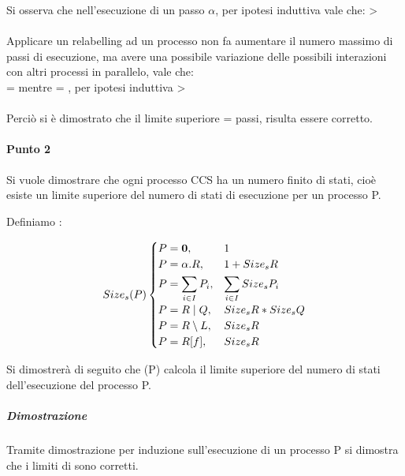 \begin{itemize}
\begin{itemize}
			Si osserva che nell'esecuzione di un passo $\alpha$, per ipotesi induttiva vale che:  >   \\
			\\
			Applicare un relabelling ad un processo non fa aumentare il numero massimo di passi di esecuzione, ma avere una possibile variazione delle possibili interazioni con altri processi in parallelo, vale che:\\  =  mentre  = , per ipotesi induttiva  > \\
			\\
		Perciò si è dimostrato che il limite superiore  =  passi, risulta essere corretto.	
				
	\end{itemize}

	
\end{itemize}

\paragraph{Punto 2} \mbox{}

Si vuole dimostrare che ogni processo CCS ha un numero finito di stati, cioè esiste un limite superiore del numero di stati di esecuzione per un processo P.

Definiamo :

\[
Size_{s}(P)
\begin{cases}
P=\mathbf{0}, 			& 1							\\
P=\alpha.R,     & 1+Size_{s}{R}                \\
P=\displaystyle\sum_{i\in I}^{}P_{i},          & \displaystyle\sum_{i\in I}^{}Size_{s}{P_{i}} \\
P=R\mid Q,      & Size_{s}{R}*Size_{s}{Q}       \\
P=R\setminus L, & Size_{s}{R}                  \\
P=R[f],         & Size_{s}{R}
\end{cases}
\]

Si dimostrerà di seguito che \sis(P) calcola il limite superiore del numero di stati dell'esecuzione del processo P.

\subparagraph{Dimostrazione} \mbox{}

Tramite dimostrazione per induzione sull'esecuzione di un processo P si dimostra che i limiti di  sono corretti.

